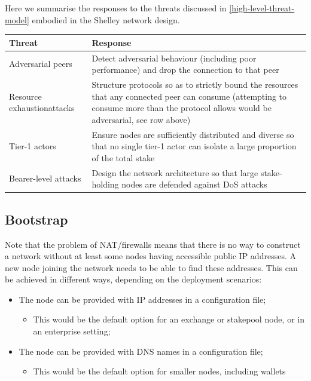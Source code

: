 \documentclass[11pt,a4paper]{article}
\begin{document}
Here we summarise the responses to the threats discussed in
\cref{high-level-threat-model} embodied in the
Shelley network design.

\begin{longtable}[]{p{4cm}p{10cm}}
\toprule
\textbf{Threat} & \textbf{Response}\tabularnewline
\midrule
\endhead
Adversarial peers & Detect adversarial behaviour (including poor
performance) and drop the connection to that peer\tabularnewline
Resource exhaustion\newline attacks & Structure protocols so as to strictly
bound the resources that any connected peer can consume (attempting to
consume more than the protocol allows would be adversarial, see row
above)\tabularnewline
Tier-1 actors & Ensure nodes are sufficiently distributed and diverse so
that no single tier-1 actor can isolate a large proportion of the total
stake\tabularnewline
Bearer-level attacks & Design the network architecture so that large
stake-holding nodes are defended against DoS attacks\tabularnewline
\bottomrule
\end{longtable}

\subsection{Bootstrap}
\label{bootstrap}

Note that the problem of NAT/firewalls means that there is no way to
construct a network without at least some nodes having accessible public
IP addresses. A new node joining the network needs to be able to find
these addresses. This can be achieved in different ways, depending on
the deployment scenarios:

\begin{itemize}
\item
  The node can be provided with IP addresses in a configuration file;

  \begin{itemize}
  \item
    This would be the default option for an exchange or stakepool node,
    or in an enterprise setting;
  \end{itemize}
\item
  The node can be provided with DNS names in a configuration file;

  \begin{itemize}
  \item
    This would be the default option for smaller nodes, including
    wallets
  \end{itemize}
\end{itemize}
\end{document}

